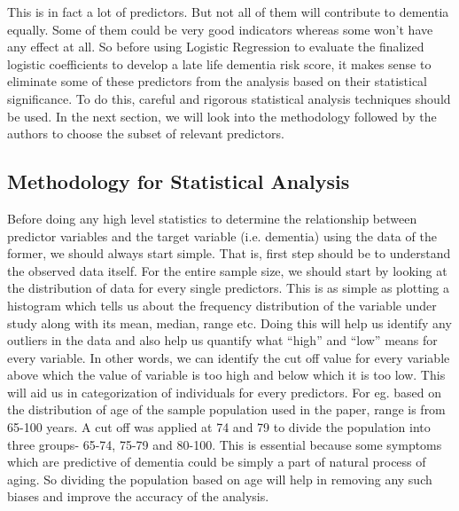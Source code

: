 \documentclass[12pt,letterpaper]{article}
\begin{document}
This is in fact a lot of predictors. But not all of them will contribute to dementia equally. Some of them could be very good indicators whereas some won't have any effect at all. So before using Logistic Regression to evaluate the finalized logistic coefficients to develop a late life dementia risk score, it makes sense to eliminate some of these predictors from the analysis based on their statistical significance. To do this, careful and rigorous statistical analysis techniques should be used. In the next section, we will look into the methodology followed by the authors to choose the subset of relevant predictors.

\subsection{Methodology for Statistical Analysis}

Before doing any high level statistics to determine the relationship between predictor variables and the target variable (i.e. dementia) using the data of the former, we should always start simple. That is, first step should be to understand the observed data itself. For the entire sample size, we should start by  looking at the distribution of data for every single predictors. This is as simple as plotting a histogram which tells us about the frequency distribution of the variable under study along with its mean, median, range etc. Doing this will help us identify any outliers in the data and also help us quantify what ``high'' and ``low'' means for every variable. In other words, we can identify the cut off value for every variable above which the value of variable is too high and below which it is too low. This will aid us in categorization of individuals for every predictors. For eg. based on the distribution of age of the sample population used in the paper, range is from 65-100 years. A cut off was applied at 74 and 79 to divide the population into three groups- 65-74, 75-79 and 80-100. This is essential because some symptoms which are predictive of dementia could be simply a part of natural process of aging. So dividing the population based on age will help in removing any such biases and improve the accuracy of the analysis.\\
\end{document}
